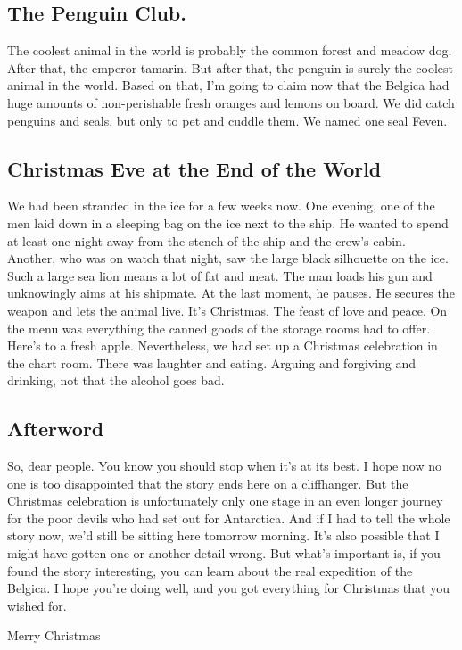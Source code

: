 \documentclass{article}
\begin{document}
  \subsection{The Penguin Club.}
  \noindent The coolest animal in the world is probably the common forest and meadow dog. After that, the emperor tamarin.
  But after that, the penguin is surely the coolest animal in the world. Based on that, I'm going to claim now
  that
  the Belgica had huge amounts of non-perishable fresh oranges and lemons on board. We did catch penguins and
  seals,
  but only to pet and cuddle them. We named one seal Feven.\\
  \subsection{Christmas Eve at the End of the World}
  \noindent We had been stranded in the ice for a few weeks now. One evening, one of the men laid down in a sleeping bag on
  the ice next to the ship. He wanted to spend at least one night away from the stench of the ship and the crew's
  cabin. Another, who was on watch that night, saw the large black silhouette on the ice. Such a large sea lion
  means a lot of fat and meat. The man loads his gun and unknowingly aims at his shipmate. At the last moment, he
  pauses. He secures the weapon and lets the animal live. It's Christmas. The feast of love and peace. On the menu
  was everything the canned goods of the storage rooms had to offer. Here's to a fresh apple. Nevertheless, we had
  set up a Christmas celebration in the chart room. There was laughter and eating. Arguing and forgiving and
  drinking, not that the alcohol goes bad.\\
  \subsection{Afterword}
  \noindent So, dear people. You know you should stop when it's at its best. I hope now no one is too disappointed that the
  story ends here on a cliffhanger. But the Christmas celebration is unfortunately only one stage in an even
  longer
  journey for the poor devils who had set out for Antarctica. And if I had to tell the whole story now, we'd still
  be sitting here tomorrow morning. It's also possible that I might have gotten one or another detail wrong. But
  what's important is, if you found the story interesting, you can learn about the real expedition of the Belgica.
  I
  hope you're doing well, and you got everything for Christmas that you wished for.\\
  \begin{center}Merry Christmas\end{center}
\end{document}
